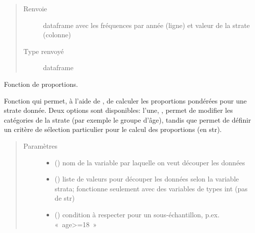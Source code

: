 \documentclass[letterpaper,10pt,french]{sphinxmanual}
\begin{document}
\begin{fulllineitems}
\begin{fulllineitems}
\begin{quote}
\begin{description}
\begin{itemize}
\end{itemize}

\item[{Renvoie}] \leavevmode
dataframe avec les fréquences par année (ligne) et valeur de la strate (colonne)

\item[{Type renvoyé}] \leavevmode
dataframe

\end{description}\end{quote}

\end{fulllineitems}


\begin{fulllineitems}
\label{\detokenize{code:simgen.statistics.prop}}
Fonction de proportions.

Fonction qui permet, à l’aide de , de calculer les proportions pondérées pour une strate donnée. Deux options sont disponibles: l’une, , permet de modifier les catégories de la strate (par exemple le groupe d’âge), tandis que  permet de définir un critère de sélection particulier pour le calcul des proportions (en str).
\begin{quote}\begin{description}
\item[{Paramètres}] \leavevmode\begin{itemize}
\item {} 
 () \textendash{} nom de la variable par laquelle on veut découper les données

\item {} 
 () \textendash{} liste de valeurs pour découper les données selon la variable strata; fonctionne seulement avec des variables de types int (pas de str)

\item {} 
 () \textendash{} condition à respecter pour un sous-échantillon, p.ex. « age\textgreater{}=18 »


\end{itemize}
\end{description}
\end{quote}
\end{fulllineitems}
\end{fulllineitems}
\end{document}
